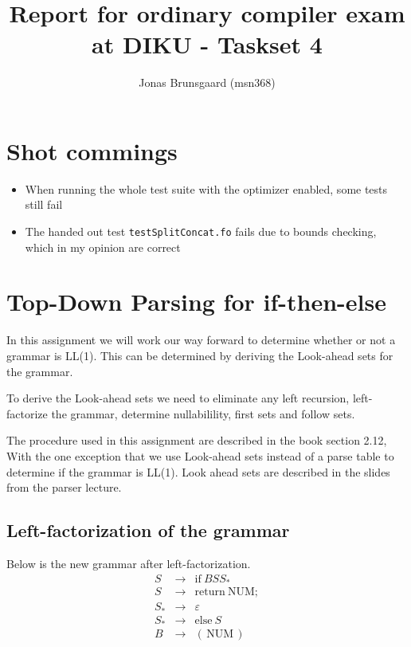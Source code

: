 \documentclass[11pt,a4paper]{article}
\title{Report for ordinary compiler exam at DIKU - Taskset 4}
\author{Jonas Brunsgaard (msn368)}
\begin{document}
\maketitle
\newpage
\tableofcontents
\newpage
\section*{Shot commings}

\begin{itemize}
  \item When running the whole test suite with the optimizer enabled, some tests still fail
  \item The handed out test \texttt{testSplitConcat.fo} fails due to bounds checking, which in my opinion are correct 
\end{itemize}

\section{Top-Down Parsing for if-then-else}
In this assignment we will work our way forward to determine whether or not
a grammar is LL(1). This can be determined by deriving the Look-ahead sets for
the grammar.

To derive the Look-ahead sets we need to eliminate any left
recursion, left-factorize the grammar, determine nullabilility, first sets
and follow sets.

The procedure used in this assignment are described in
the book section 2.12, With the one exception that we use Look-ahead sets
instead of a parse table to determine if the grammar is LL(1). Look ahead sets
are described in the slides from the parser lecture.

\subsection{Left-factorization of the grammar}
Below is the new grammar after left-factorization.
$$
\begin{array}{lcl}
    S & \rightarrow & \mathrm{if\:}BSS_* \\
    S & \rightarrow & \mathrm{return\:NUM;} \\
    S_* & \rightarrow & \varepsilon \\
    S_* & \rightarrow & \mathrm{else}\:S \\
    B & \rightarrow & \mathrm{(\,NUM\,)} \\
\end{array}
$$
\end{document}
